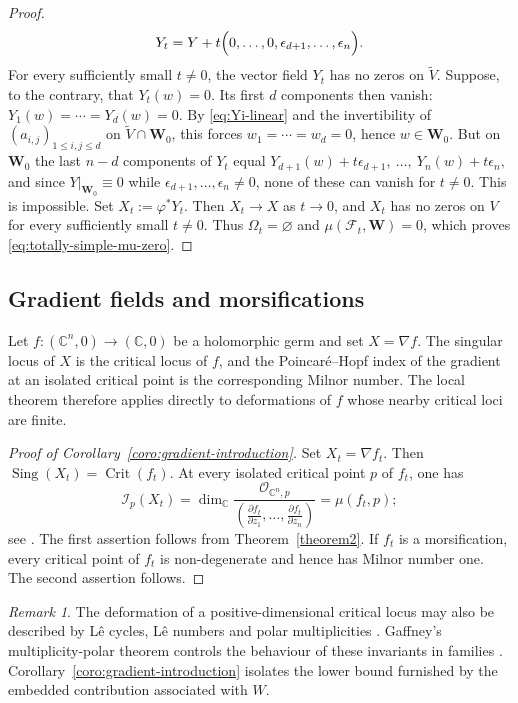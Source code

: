 \documentclass[10pt,twoside]{amsart}
\numberwithin{equation}{section}
\theoremstyle{definition}
\theoremstyle{remark}
\newtheorem{remark}[proposition]{Remark}
\DeclareMathOperator{\sing}{Sing}
\newcommand{\fol}{\mathcal{F}}
\newcommand{\W}{\mathbf{W}}
\begin{document}
\begin{proof}
\begin{equation}\label{eq:Yt-translation}
Y_t
=
Y+t\Bigl(0,\ldots,0,\epsilon_{d+1},\ldots,\epsilon_n\Bigr).
\end{equation}
For every sufficiently small $t\neq0$, the vector field $Y_t$ has no zeros on $\widetilde V$. Suppose, to the contrary, that $Y_t(w)=0$. Its first $d$ components then vanish:
$Y_1(w)=\cdots=Y_d(w)=0$. By \eqref{eq:Yi-linear} and the invertibility of $(a_{i,j})_{1\leq i,j\leq d}$ on
$\widetilde V\cap\W_0$, this forces $w_1=\cdots=w_d=0$, hence $w\in\W_0$.
But on $\W_0$ the last $n-d$ components of $Y_t$ equal
$
Y_{d+1}(w)+t\epsilon_{d+1},\ \ldots,\ Y_n(w)+t\epsilon_n,
$
and since $Y|_{\W_0}\equiv 0$ while $\epsilon_{d+1},\ldots,\epsilon_n\ne 0$, none of these can vanish for $t\ne0$.
This is impossible. Set $X_t:=\varphi^*Y_t$. Then $X_t\to X$ as $t\to0$, and $X_t$ has no zeros on $V$ for every sufficiently small $t\neq0$. Thus $\Omega_t=\varnothing$ and $\mu(\fol_t,\W)=0$, which proves \eqref{eq:totally-simple-mu-zero}.
\end{proof}


\subsection{Gradient fields and morsifications}\label{subsec:gradient-fields}

Let
$
f:(\mathbb C^n,0)\longrightarrow(\mathbb C,0)
$
be a holomorphic germ and set $X=\nabla f$. The singular locus of $X$ is the critical locus of $f$, and the Poincar\'e--Hopf index of the gradient at an isolated critical point is the corresponding Milnor number. The local theorem therefore applies directly to deformations of $f$ whose nearby critical loci are finite.

\begin{proof}[Proof of Corollary~\ref{coro:gradient-introduction}]
Set $X_t=\nabla f_t$. Then
$
\sing(X_t)=\operatorname{Crit}(f_t).
$
At every isolated critical point $p$ of $f_t$, one has
\[
\mathcal I_p(X_t)
=
\dim_{\mathbb C}
\frac{\mathcal O_{\mathbb C^n,p}}
{\left(
\frac{\partial f_t}{\partial z_1},\ldots,
\frac{\partial f_t}{\partial z_n}
\right)}
=
\mu(f_t,p);
\]
see \cite{Milnor}. The first assertion follows from Theorem~\ref{theorem2}. If $f_t$ is a morsification, every critical point of $f_t$ is non-degenerate and hence has Milnor number one. The second assertion follows.
\end{proof}

\begin{remark}
The deformation of a positive-dimensional critical locus may also be described by L\^e cycles, L\^e numbers and polar multiplicities \cite{LeTeissier81,MasseyLeCycles}. Gaffney's multiplicity-polar theorem controls the behaviour of these invariants in families \cite{Gaffney92,Gaffney93}. Corollary~\ref{coro:gradient-introduction} isolates the lower bound furnished by the embedded contribution associated with $W$.
\end{remark}
\end{document}
